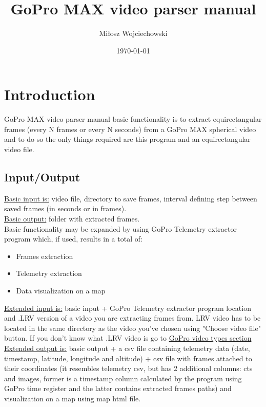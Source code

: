 \documentclass[a4paper,12pt]{book}
\begin{document}
\author{Miłosz Wojciechowski}
\title{GoPro MAX video parser manual}
\date{\today}


\maketitle
\pagebreak
{}
\renewcommand{\labelenumii}{\arabic{enumi}.\arabic{enumii}}
\tableofcontents
\chapter{Introduction}
GoPro MAX video parser manual basic functionality is to extract equirectangular frames (every N frames or every N seconds) from a GoPro MAX spherical video and to do so the only things required are this program and an equirectangular video file.\\

\section{Input/Output}

\underline{Basic input is:} video file, directory to save frames, interval defining step between saved frames (in seconds or in frames).\\

\underline{Basic output:} folder with extracted frames.\\

Basic functionality may be expanded by using GoPro Telemetry extractor program which, if used, results in a total of:
\begin{itemize}
	\item Frames extraction
	\item Telemetry extraction
	\item Data visualization on a map
\end{itemize}

\underline{Extended input is:} basic input + GoPro Telemetry extractor program location and .LRV version of a video you are extracting frames from. LRV video has to be located in the same directory as the video you've chosen using "Choose video file" button. If you don't know what .LRV video is go to \hyperref[sec:video]{GoPro video types section}\\

\underline{Extended output is:} basic output + a csv file containing telemetry data (date, timestamp, latitude, longitude and altitude) + csv file with frames attached to their coordinates (it resembles telemetry csv, but has 2 additional columns: cts and images, former is a timestamp column calculated by the program using GoPro time register and the latter contains extracted frames paths) and visualization on a map using map html file.
\end{document}
